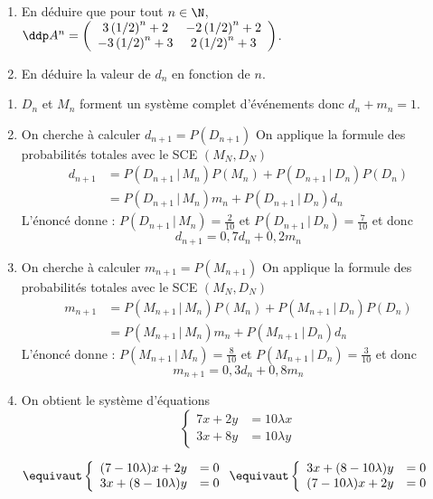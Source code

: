 \begin{exercice}
\begin{enumerate}
\item En déduire que pour tout  $n\in \N$, $\ddp A^n=\left(\begin{array}{ccc}
3\left( 1/2\right)^n +2 & -2\left( 1/2\right)^n +2\\
-3\left( 1/2\right)^n +3& 2\left( 1/2\right)^n +3
\end{array}
\right)$.
\item En déduire la valeur de $d_n$ en fonction de $n$. 
\end{enumerate}
\end{exercice}



\begin{correction}
\begin{enumerate}
\item $D_n$ et $M_n$ forment un système complet d'événements donc $
d_n+m_n=1$. 
\item On cherche à calculer $d_{n+1} =P(D_{n+1})$ 
On applique la formule des probabilités totales avec le SCE $(M_N,D_N)$
\begin{align*}
d_{n+1} &= P(D_{n+1}\, |\, M_n) P(M_n) +P(D_{n+1}\, |\, D_n) P(D_n)\\
			&= P(D_{n+1}\, |\, M_n) m_n +P(D_{n+1}\, |\, D_n) d_n
\end{align*}
L'énoncé donne : $ P(D_{n+1}\, |\, M_n) = \frac{2}{10}$ et  $ P(D_{n+1}\, |\, D_n) = \frac{7}{10}$
et donc 
$$d_{n+1} = 0,7 d_n  +0,2 m_n$$

\item On cherche à calculer $m_{n+1} =P(M_{n+1})$ 
On applique la formule des probabilités totales avec le SCE $(M_N,D_N)$
\begin{align*}
m_{n+1} &= P(M_{n+1}\, |\, M_n) P(M_n) +P(M_{n+1}\, |\, D_n) P(D_n)\\
			&= P(M_{n+1}\, |\, M_n) m_n +P(M_{n+1}\, |\, D_n) d_n
\end{align*}
L'énoncé donne : $ P(M_{n+1}\, |\, M_n) = \frac{8}{10}$ et  $ P(M_{n+1}\, |\, D_n) = \frac{3}{10}$
et donc 
$$m_{n+1} = 0,3 d_n  +0,8 m_n$$

\item 
On obtient le système d'équations
$$\left\{  
\begin{array}{cc}
7x +2y  &=10\lambda x\\
3x +8y  &=10\lambda y
\end{array}\right.$$



$
\equivaut
\left\{  
\begin{array}{cc}
(7-10\lambda) x +2y  &=0\\
3x +(8-10\lambda)y  &=0
\end{array}\right.
\equivaut 
\left\{  
\begin{array}{cc}
3x +(8-10\lambda)y  &=0\\
(7-10\lambda) x +2y  &=0
\end{array}\right.$


\end{enumerate}
\end{correction}
